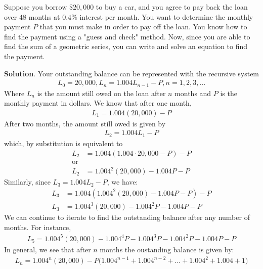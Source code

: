 \documentclass[10pt,]{book}
\theoremstyle{ptxdefinitionnotitle}
\theoremstyle{ptxdefinitiontitle}
\theoremstyle{ptxdefinitionnotitle}
\theoremstyle{ptxdefinitiontitle}
\theoremstyle{ptxdefinitionnotitle}
\theoremstyle{ptxdefinitiontitle}
\numberwithin{equation}{section}
\begin{document}
\begin{example}\label{example-12}
\hypertarget{p-155}{}%
Suppose you borrow \(\$20,000\) to buy a car, and you agree to pay back the loan over \(48\) months at \(0.4 \%\) interest per month.  You want to determine the monthly payment \(P\) that you must make in order to pay off the loan. You know how to find the payment using a "guess and check" method.  Now, since you are able to find the sum of a geometric series, you can write and solve an equation to find the payment.%
\par\smallskip%
\noindent\textbf{Solution}.\hypertarget{solution-12}{}\quad%
\hypertarget{p-156}{}%
Your outstanding balance can be represented with the recursive system%
%
\begin{gather*}
L_0=20,000, L_n=1.004L_{n-1}-P, n=1,2,3,...
\end{gather*}
\hypertarget{p-157}{}%
Where \(L_n\) is the amount still owed on the loan after \(n\) months and \(P\) is the monthly payment in dollars.  We know that after one month,%
%
\begin{gather*}
L_1=1.004(20,000)-P
\end{gather*}
\hypertarget{p-158}{}%
After two months, the amount still owed is given by%
%
\begin{gather*}
L_2 = 1.004L_1-P
\end{gather*}
\hypertarget{p-159}{}%
which, by substitution is equivalent to%
%
\begin{align*}
L_2&=1.004(1.004 \cdot 20,000 - P) - P\\
\text{or}\\
L_2&=1.004^2(20,000)-1.004P-P
\end{align*}
\hypertarget{p-160}{}%
Similarly, since \(L_3=1.004L_2-P\), we have:%
%
\begin{align*}
L_3&=1.004(1.004^2 (20,000) - 1.004P - P) - P\\
L_3&=1.004^3(20,000) - 1.004^2P - 1.004P - P
\end{align*}
\hypertarget{p-161}{}%
We can continue to iterate to find the outstanding balance after any number of months. For instance,%
%
\begin{gather*}
L_5=1.004^5 (20,000)-1.004^4 P-1.004^3 P-1.004^2 P-1.004P-P
\end{gather*}
\hypertarget{p-162}{}%
In general, we see that after \(n\) months the oustanding balance is given by:%
%
\begin{gather}
L_n=1.004^n (20,000) - P \big( 1.004^{n-1} + 1.004^{n-2} + ... + 1.004^2 + 1.004 + 1 \big)\label{general-annuity-formula-long}

\end{gather}
\end{example}
\end{document}
